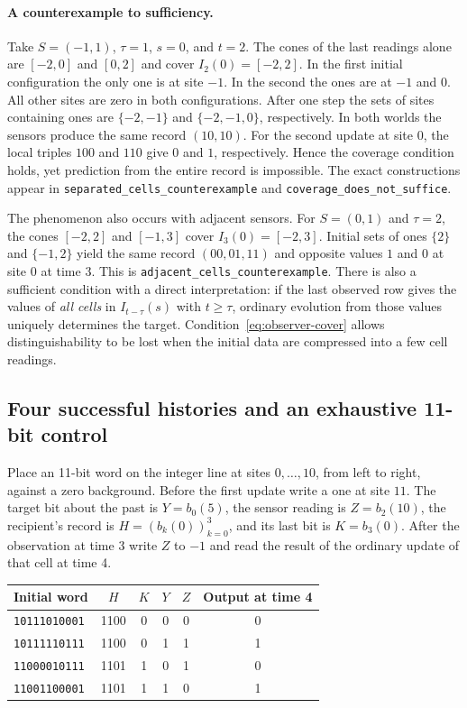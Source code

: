 \paragraph{A counterexample to sufficiency.}
Take $S=(-1,1)$, $\tau=1$, $s=0$, and $t=2$. The cones of the last readings alone are $[-2,0]$ and $[0,2]$ and cover $I_2(0)=[-2,2]$. In the first initial configuration the only one is at site $-1$. In the second the ones are at $-1$ and $0$. All other sites are zero in both configurations. After one step the sets of sites containing ones are $\{-2,-1\}$ and $\{-2,-1,0\}$, respectively. In both worlds the sensors produce the same record $(10,10)$. For the second update at site $0$, the local triples $100$ and $110$ give $0$ and $1$, respectively. Hence the coverage condition holds, yet prediction from the entire record is impossible. The exact constructions appear in \texttt{separated\_cells\_counterexample} and \texttt{coverage\_does\_not\_suffice}.

The phenomenon also occurs with adjacent sensors. For $S=(0,1)$ and $\tau=2$, the cones $[-2,2]$ and $[-1,3]$ cover $I_3(0)=[-2,3]$. Initial sets of ones $\{2\}$ and $\{-1,2\}$ yield the same record $(00,01,11)$ and opposite values $1$ and $0$ at site $0$ at time $3$. This is \texttt{adjacent\_cells\_counterexample}. There is also a sufficient condition with a direct interpretation: if the last observed row gives the values of \emph{all cells} in $I_{t-\tau}(s)$ with $t\ge\tau$, ordinary evolution from those values uniquely determines the target. Condition~\eqref{eq:observer-cover} allows distinguishability to be lost when the initial data are compressed into a few cell readings.

\subsection{Four successful histories and an exhaustive 11-bit control}

Place an 11-bit word on the integer line at sites $0,\ldots,10$, from left to right, against a zero background. Before the first update write a one at site $11$. The target bit about the past is $Y=b_0(5)$, the sensor reading is $Z=b_2(10)$, the recipient's record is $H=(b_k(0))_{k=0}^3$, and its last bit is $K=b_3(0)$. After the observation at time 3 write $Z$ to $-1$ and read the result of the ordinary update of that cell at time 4.

\begin{center}
\begin{tabular}{lccccc}
Initial word & $H$ & $K$ & $Y$ & $Z$ & Output at time 4 \\
\hline
\texttt{10111010001} & 1100 & 0 & 0 & 0 & 0 \\
\texttt{10111110111} & 1100 & 0 & 1 & 1 & 1 \\
\texttt{11000010111} & 1101 & 1 & 0 & 1 & 0 \\
\texttt{11001100001} & 1101 & 1 & 1 & 0 & 1
\end{tabular}
\end{center}

